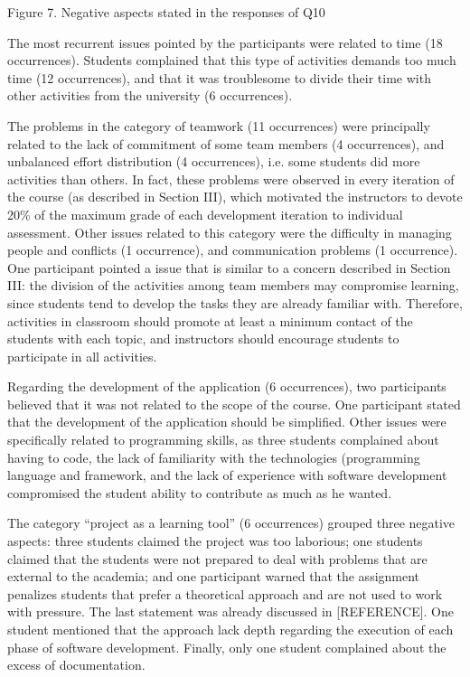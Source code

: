 Figure 7. Negative aspects stated in the responses of Q10

The most recurrent issues pointed by the participants were related to time (18 occurrences). Students complained that this type of activities demands too much time (12 occurrences), and that it was troublesome to divide their time with other activities from the university (6 occurrences). 

The problems in the category of teamwork (11 occurrences) were principally related to the lack of commitment of some team members (4 occurrences), and unbalanced effort distribution (4 occurrences), i.e. some students did more activities than others. In fact, these problems were observed in every iteration of the course (as described in Section III), which motivated the instructors to devote 20\% of the maximum grade of each development iteration to individual assessment. Other issues related to this category were the difficulty in managing people and conflicts (1 occurrence), and communication problems (1 occurrence). One participant pointed a issue that is similar to a concern described in Section III: the division of the activities among team members may compromise learning, since students tend to develop the tasks they are already familiar with. Therefore, activities in classroom should promote at least a minimum contact of the students with each topic, and instructors should encourage students to participate in all activities.

Regarding the development of the application (6 occurrences), two participants believed that it was not related to the scope of the course. One participant stated that the development of the application should be simplified. Other issues were specifically related to programming skills, as three students complained about having to code, the lack of familiarity with the technologies (programming language and framework, and the lack of experience with software development compromised the student ability to contribute as much as he wanted.

The category “project as a learning tool” (6 occurrences) grouped three negative aspects: three students claimed the project was too laborious; one students claimed that the students were not prepared to deal with problems that are external to the academia; and one participant warned that the assignment penalizes students that prefer a theoretical approach and are not used to work with pressure. The last statement was already discussed in [REFERENCE]. One student mentioned that the approach lack depth regarding the execution of each phase of software development. Finally, only one student complained about the excess of documentation.

